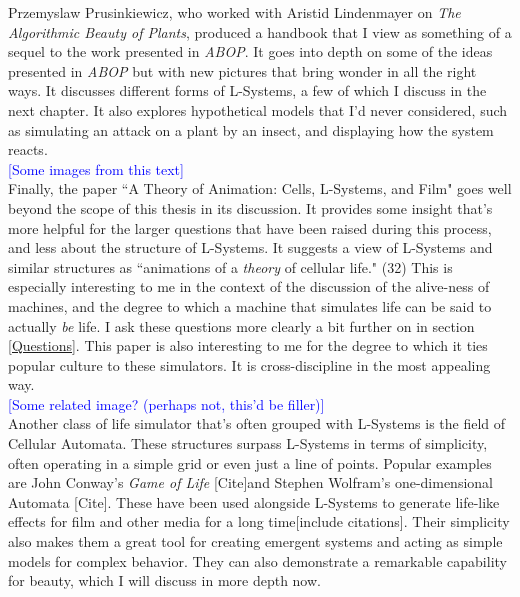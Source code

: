 \documentclass[12pt,twoside]{reedthesis}
\begin{document}
	Przemyslaw Prusinkiewicz, who worked with Aristid Lindenmayer on \textit{The Algorithmic Beauty of Plants}, produced a handbook that I view as something of a sequel to the work presented in \textit{ABOP}. It goes into depth on some of the ideas presented in \textit{ABOP} but with new pictures that bring wonder in all the right ways. It discusses different forms of L-Systems, a few of which I discuss in the next chapter. It also explores hypothetical models that I'd never considered, such as simulating an attack on a plant by an insect, and displaying how the system reacts.\\
	
	\textcolor{blue}{[Some images from this text]}\\
	
	Finally, the paper ``A Theory of Animation: Cells, L-Systems, and Film" goes well beyond the scope of this thesis in its discussion. It provides some insight that's more helpful for the larger questions that have been raised during this process, and less about the structure of L-Systems. It suggests a view of L-Systems and similar structures as ``animations of a \textit{theory} of cellular life." (32) This is especially interesting to me in the context of the discussion of the alive-ness of machines, and the degree to which a machine that simulates life can be said to actually \textit{be} life. I ask these questions more clearly a bit further on in section \ref{Questions}. This paper is also interesting to me for the degree to which it ties popular culture to these simulators. It is cross-discipline in the most appealing way.\\
	
	\textcolor{blue}{[Some related image? (perhaps not, this'd be filler)]}\\
	
	Another class of life simulator that's often grouped with L-Systems is the field of Cellular Automata. These structures surpass L-Systems in terms of simplicity, often operating in a simple grid or even just a line of points. Popular examples are John Conway's \textit{Game of Life} [Cite]and Stephen Wolfram's one-dimensional Automata [Cite]. These have been used alongside L-Systems to generate life-like effects for film and other media for a long time[include citations]. Their simplicity also makes them a great tool for creating emergent systems and acting as simple models for complex behavior. They can also demonstrate a remarkable capability for beauty, which I will discuss in more depth now.
\end{document}
